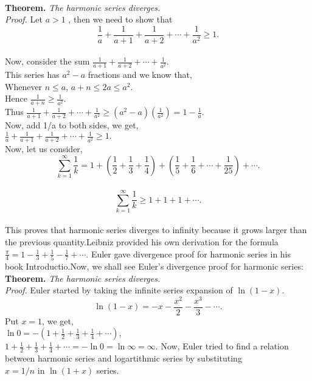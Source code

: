 \documentclass[a4paper,11pt]{article}
\begin{document}
\\
\textbf{Theorem.}  \textit{The harmonic series diverges.}\\
\textit{Proof.} Let $a>1$ , then we need to show that\\
 $$ \frac{1}{a} + \frac{1}{a+1} + \frac{1}{a+2} + \cdots + \frac{1}{a^2} \geq 1. $$\\
Now, consider the sum $ \frac{1}{a+1} + \frac{1}{a+2} + \cdots + \frac{1}{a^2} .$ \\
This series has $a^2 - a$ fractions and we know that,\\
Whenever $n \leq a$, $a+n \leq 2a \leq a^2$.\\
Hence $\frac{1}{a+n} \geq \frac{1}{a^2}. $\\
Thus  $ \frac{1}{a+1} + \frac{1}{a+2} + \cdots + \frac{1}{a^2} \geq (a^2-a)(\frac{1}{a^2}) = 1 - \frac{1}{a}. $\\
Now, add 1/a to both sides, we get,\\
 $\frac{1}{a} + \frac{1}{a+1} + \frac{1}{a+2} + \cdots + \frac{1}{a^2} \geq 1.$ \\
 Now, let us consider,\\
  $$\sum_{k=1}^{\infty}\frac{1}{k} = 1 + (\frac{1}{2} + \frac{1}{3} + \frac{1}{4}) +
  (\frac{1}{5} + \frac{1}{6} + \cdots + \frac{1}{25}) + \cdots. $$\\
        $$\sum_{k=1}^{\infty}\frac{1}{k}  \geq 1 + 1 + 1 + \cdots. $$\\
This proves that harmonic series diverges to infinity because it grows larger than the previous quantity.Leibniz provided his own derivation for the formula $\frac{\pi}{4} = 1 - \frac{1}{3} + \frac{1}{5} - \frac{1}{7} + \cdots. $ Euler gave divergence proof for harmonic series in his book Introductio.Now, we shall see Euler's divergence proof for harmonic series:\\
\textbf{Theorem.} \textit{ The harmonic series diverges.}\\
\textit{Proof.} Euler started by taking the infinite series expansion of  $\ln(1-x)$.\\
$$ \ln(1-x) = -x - \frac{x^2}{2} - \frac{x^3}{3} - \cdots. $$
Put $x=1$, we get,\\
$ \ln0 = -(1 + \frac{1}{2} + \frac{1}{3} + \frac{1}{4} + \cdots) $,\\
$ 1 + \frac{1}{2} + \frac{1}{3} + \frac{1}{4} + \cdots = -\ln0 = \ln\infty = \infty. $
Now, Euler tried to find a relation between harmonic series and logartithmic series by substituting\\ $x = 1/n$ in $\ln (1+x)$ series.\\
\end{document}
